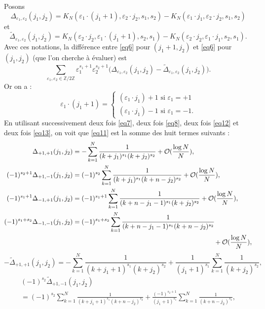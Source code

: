 \documentclass[12pt,francais, reqno]{smfart}
\numberwithin{equation}{section}
\newcommand{\Z}{\mathbb Z}
\newcommand{\gdo}{\mathcal{O}}
\newcommand{\Deltati}{\widetilde{\Delta}}
\newcommand{\zdz}{\Z / 2 \Z}
\newcommand{\eps}{\varepsilon}
\begin{document}
Posons 
$$\Delta_{\eps_1, \eps_2} (j_1, j_2) = 
K_N(\eps_1 \cdot (j_1+1) , \eps_2 \cdot  j_2, s_1, s_2)
- K_N(\eps_1 \cdot j_1, \eps_2 \cdot  j_2, s_1, s_2)$$
et 
$$ \Deltati_{\eps_1, \eps_2} (j_1, j_2) = 
K_N(\eps_2 \cdot j_2 , \eps_1 \cdot ( j_1+1), s_2, s_1)
-K_N(\eps_2 \cdot j_2 , \eps_1 \cdot  j_1, s_2, s_1). $$
Avec ces notations, la diff\'erence entre \eqref{eq6} pour $(j_1+1, j_2)$ et  \eqref{eq6} pour $(j_1, j_2)$ (que l'on cherche \`a \'evaluer) est 
\begin{equation} \label{eq11}
\sum_{\eps_1, \eps_2 \in \zdz} \eps_1 ^{s_1+1}  \eps_2 ^{s_2+1} 
\Big(  \Delta_{\eps_1, \eps_2} (j_1, j_2) 
-  \Deltati_{\eps_1, \eps_2} (j_1, j_2)    \Big) .
\end{equation}
Or on a :
$$\eps_1 \cdot ( j_1+1) = 
\left\{
\begin{array}{l}
(\eps_1 \cdot j_1) + 1 \mbox{ si } \eps_1 = +1 \\
(\eps_1 \cdot j_1) - 1 \mbox{ si } \eps_1 = -1.  
\end{array}
\right.
$$
En utilisant successivement deux fois \eqref{eq7}, deux fois \eqref{eq8}, deux fois \eqref{eq12} et deux fois \eqref{eq13}, on voit que \eqref{eq11} est la somme des huit termes suivants : 
\begin{align}
\Delta_{+1, +1 } (j_1, j_2) 
&= - \sum_{k= 1} ^N  \frac{1}{(k+j_1)^{s_1} (k+j_2)^{s_2}}  +  \gdo (\frac{\log N}{N}) , 
														\label{eq14}\\
(-1)^{s_2+1} \Delta_{+1, -1 } (j_1, j_2) 
&= (-1)^{s_2} \sum_{k= 1} ^N  \frac{1}{(k+j_1)^{s_1} (k+n-j_2)^{s_2}}  +  \gdo (\frac{\log N}{N}) ,
														\label{eq15}\\
(-1)^{s_1+1} \Delta_{-1, +1 } (j_1, j_2) 
&= (-1)^{s_1+1} \sum_{k= 1} ^N  \frac{1}{(k+n-j_1-1)^{s_1} (k+j_2)^{s_2}}  +  \gdo (\frac{\log N}{N}) ,
														\label{eq16}\\
(-1)^{s_1+s_2} \Delta_{-1, -1 } (j_1, j_2) 
&= (-1)^{s_1+s_2} \sum_{k= 1} ^N  \frac{1}{(k+n-j_1-1)^{s_1} (k+n-j_2)^{s_2}} \label{eq17} 
\\
& \hspace{7.5cm}  + 
\gdo (\frac{\log N}{N}),  \nonumber
\end{align}													
\begin{equation}													
- \Deltati_{+1, +1 } (j_1, j_2)  
= - \sum_{k= 1} ^N  \frac{1}{(k+j_1+1)^{s_1} (k+j_2)^{s_2}}  +  
\frac{1}{(j_1+1)^{s_1}} \sum_{k=1} ^N \frac{1}{(k+j_2)^{s_2}},	\label{eq18}
\end{equation}	
\begin{multline}													
(-1)^{s_2} \Deltati_{+1, -1 } (j_1, j_2) 
\\
= (-1)^{s_2} \sum_{k= 1} ^N  \frac{1}{(k+j_1+1)^{s_1} (k+n-j_2)^{s_2}}  +  
\frac{(-1)^{s_2+1}}{(j_1+1)^{s_1}} \sum_{k=1} ^N \frac{1}{(k+n-j_2)^{s_2}},	
\label{eq19}
\end{multline}
\end{document}
